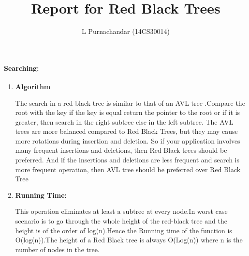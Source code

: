 \documentclass[a4paper,11pt]{article}
\title{Report for Red Black Trees}
\author{L Purnachandar (14CS30014)}
\begin{document}
\maketitle

\paragraph{Searching:}
\begin{enumerate}
 \item \textbf{Algorithm}

The search in  a red black tree is similar to that of an AVL tree .Compare the root with the key if the key is equal return the pointer to the root or if it is  greater, then search in the right subtree else in the left subtree.
The AVL trees are more balanced compared to Red Black Trees, but they may cause more rotations during insertion and deletion. So if your application involves many frequent insertions and deletions, then Red Black trees should be preferred. And if the insertions and deletions are less frequent and search is more frequent operation, then AVL tree should be preferred over Red Black Tree

 \item \textbf{Running Time:}

This operation eliminates at least a  subtree at every node.In worst case scenario is to go through the whole height of the red-black tree and the height is of the order of log(n).Hence the Running time of the function is O(log(n)).The height of a Red Black tree is always O(Log(n)) where n is the number of nodes in the tree.\\

 
\end{enumerate}
\end{document}

